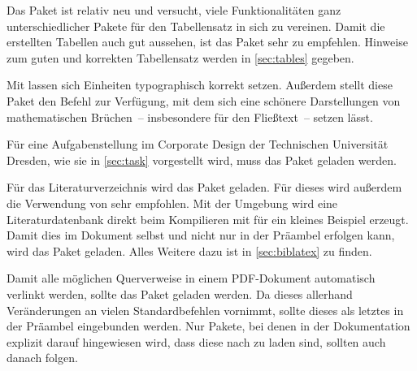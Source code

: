 \documentclass[english,ngerman]{tudscrartcl}
\begin{document}
%
\begin{Tutorial*}
\usepackage{fixltx2e}
\end{Tutorial*}
%
Das Paket  ist relativ neu und versucht, viele Funktionalitäten 
ganz unterschiedlicher Pakete für den Tabellensatz in sich zu vereinen. Damit 
die erstellten Tabellen auch gut aussehen, ist das Paket  
sehr zu empfehlen. Hinweise zum guten und korrekten Tabellensatz werden in 
\autoref{sec:tables} gegeben.
%
\begin{Tutorial*}
\usepackage{tabu}
\usepackage{booktabs}
\end{Tutorial*}
%
Mit  lassen sich Einheiten typographisch korrekt setzen. 
Außerdem stellt diese Paket den Befehl  zur Verfügung, mit dem 
sich eine schönere Darstellungen von mathematischen Brüchen~-- insbesondere für 
den Fließtext~-- setzen lässt.
%
\begin{Tutorial*}
\usepackage{units}
\end{Tutorial*}
%
Für eine Aufgabenstellung im Corporate Design der Technischen Universität 
Dresden, wie sie in \autoref{sec:task} vorgestellt wird, muss das Paket 
 geladen werden.
%
\begin{Tutorial*}
\usepackage{tudscrsupervisor}
\end{Tutorial*}
%
Für das Literaturverzeichnis wird das Paket  geladen. Für 
dieses wird außerdem die Verwendung von  sehr empfohlen. Mit 
der Umgebung  wird eine Literaturdatenbank 
 direkt beim Kompilieren mit  für ein 
kleines Beispiel erzeugt. Damit dies im Dokument selbst und nicht nur in der 
Präambel erfolgen kann, wird das Paket  geladen. Alles 
Weitere dazu ist in \autoref{sec:biblatex} zu finden.
%
\begin{Tutorial*}
\usepackage{csquotes}
\usepackage[backend=biber,style=alphabetic]{biblatex}
\usepackage{filecontents}

\end{Tutorial*}
%
Damit alle möglichen Querverweise in einem PDF-Dokument automatisch verlinkt 
werden, sollte das Paket  geladen werden. Da dieses allerhand 
Veränderungen an vielen Standardbefehlen vornimmt, sollte dieses als letztes in 
der Präambel eingebunden werden. Nur Pakete, bei denen in der Dokumentation 
explizit darauf hingewiesen wird, dass diese nach  zu laden 
sind, sollten auch danach folgen.
%
\begin{Tutorial*}
\usepackage{hyperref}
\end{Tutorial*}
\end{document}
